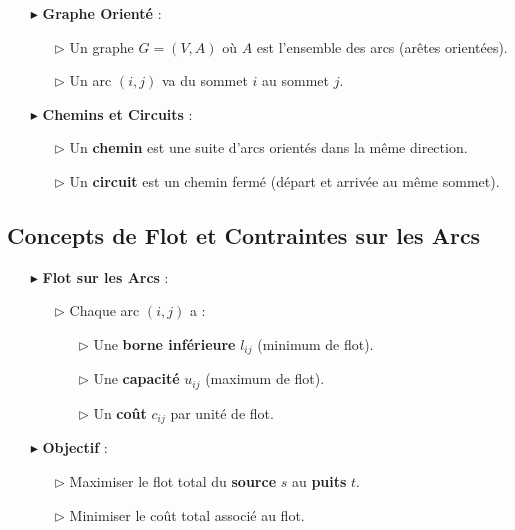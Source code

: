 \documentclass{report}
\begin{document}
\begin{multicols*}{2}
\begin{itemize}
    \item[$\blacktriangleright$] \textbf{Graphe Orienté} :
    \begin{itemize}
        \item[$\rhd$] Un graphe \( G = (V, A) \) où \( A \) est l'ensemble des arcs (arêtes orientées).
        \item[$\rhd$] Un arc \( (i, j) \) va du sommet \( i \) au sommet \( j \).
    \end{itemize}
    \item[$\blacktriangleright$] \textbf{Chemins et Circuits} :
    \begin{itemize}
        \item[$\rhd$] Un \textbf{chemin} est une suite d'arcs orientés dans la même direction.
        \item[$\rhd$] Un \textbf{circuit} est un chemin fermé (départ et arrivée au même sommet).
    \end{itemize}
\end{itemize}

\subsection*{Concepts de Flot et Contraintes sur les Arcs}

\begin{itemize}
    \item[$\blacktriangleright$] \textbf{Flot sur les Arcs} :
    \begin{itemize}
        \item[$\rhd$] Chaque arc \( (i, j) \) a :
        \begin{itemize}
            \item[$\rhd$] Une \textbf{borne inférieure} \( l_{ij} \) (minimum de flot).
            \item[$\rhd$] Une \textbf{capacité} \( u_{ij} \) (maximum de flot).
            \item[$\rhd$] Un \textbf{coût} \( c_{ij} \) par unité de flot.
        \end{itemize}
    \end{itemize}
    \item[$\blacktriangleright$] \textbf{Objectif} :
    \begin{itemize}
        \item[$\rhd$] Maximiser le flot total du \textbf{source} \( s \) au \textbf{puits} \( t \).
        \item[$\rhd$] Minimiser le coût total associé au flot.
    \end{itemize}
\end{itemize}


\end{multicols*}
\end{document}
